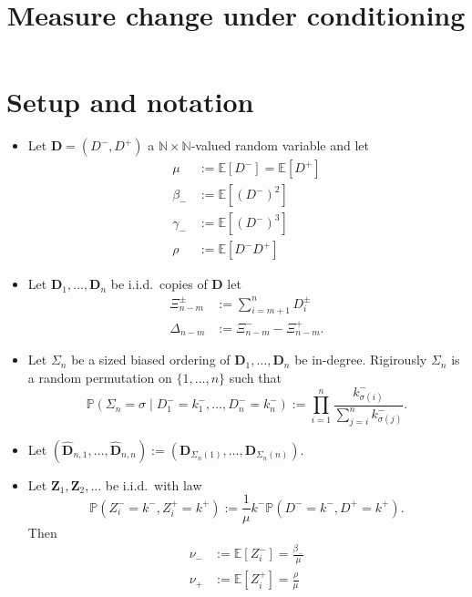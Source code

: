 \documentclass[draft]{scrartcl}
\title{Measure change under conditioning}
\author{}
\date{}
\newcommand{\N}{\mathbb N}
\newcommand{\E}{\mathbb E}
\newcommand{\biasD}{\hat{D}}
\newcommand{\defeq}{:=}
\newcommand{\vect}{\mathbf}
\renewcommand{\Pr}{\mathbb P}
\begin{document}
\maketitle

\section{Setup and notation}

\begin{itemize}
    \item Let $\vect{D} = (D^-, D^+)$ a $\N \times \N$-valued random variable and let 
        \begin{align}
            \mu &\defeq \E[D^-] = \E[D^+] \\
            \beta_- &\defeq \E[(D^-)^2] \\
            \gamma_- &\defeq \E[(D^-)^3] \\
            \rho &\defeq \E[D^- D^+]
        \end{align}
    \item Let $\vect{D}_1, \ldots, \vect{D}_n$ be i.i.d.\ copies of $\vect{D}$ let 
        \begin{align}
            \Xi^{\pm}_{n-m} &\defeq \sum_{i = m + 1}^n D^{\pm}_i \\
            \Delta_{n-m} &\defeq \Xi^-_{n-m} - \Xi^+_{n-m}.
        \end{align}
    \item Let $\Sigma_n$ be a sized biased ordering of $\vect{D}_1, \ldots, \vect{D}_n$ be in-degree. Rigirously $\Sigma_n$ is a random permutation on $\{1, \ldots, n\}$ such that
        \begin{equation}
            \Pr(\Sigma_n = \sigma \mid D^-_1 = k^-_1, \ldots, D^-_n = k^-_n) \defeq
            \prod_{i=1}^n \frac{k^-_{\sigma(i)}}{\sum_{j=i}^n k^-_{\sigma(j)}}.
        \end{equation}
    \item Let $(\vect{\biasD}_{n, 1}, \ldots, \vect{\biasD}_{n, n}) \defeq (\vect{D}_{\Sigma_n(1)}, \ldots, \vect{D}_{\Sigma_n(n)})$.
    \item Let $\vect{Z}_1, \vect{Z}_2, \ldots$ be i.i.d.\ with law
        \begin{equation}
            \Pr(Z^-_i = k^-, Z^+_i = k^+) \defeq \frac{1}{\mu} k^- \Pr(D^- = k^-, D^+ = k^+).
        \end{equation}
        Then
        \begin{align}
            \nu_- &\defeq \E[Z^-_i] = \tfrac{\beta_-}{\mu} \\
            \nu_+ &\defeq \E[Z^+_i] = \tfrac{\rho}{\mu}
        \end{align}
\end{itemize}
\end{document}
